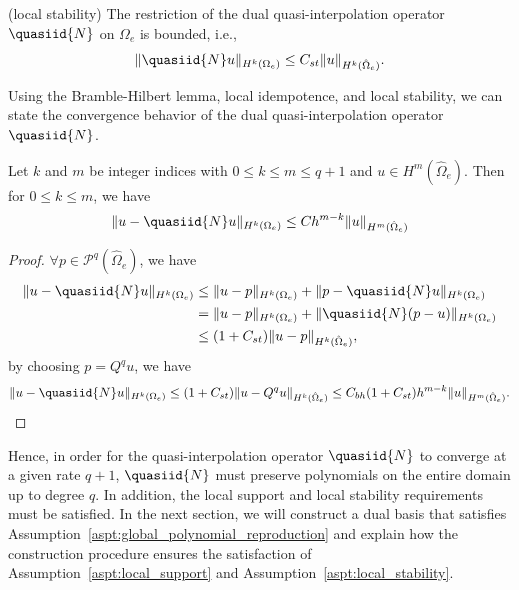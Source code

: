 \begin{assumption}\label{aspt:local_stability}
	(local stability) The restriction of the dual quasi-interpolation operator $\quasiid{N}$ on $\Omega_e$ is bounded, i.e.,
	\begin{equation}
		\|\quasiid{N}u\|_{H^k(\Omega_e)}\leq{}C_{st}\|u\|_{H^k(\hat{\Omega}_e)}.
	\end{equation}
\end{assumption}

Using the Bramble-Hilbert lemma, local idempotence, and local stability, we can state the convergence behavior of the dual quasi-interpolation operator $\quasiid{N}$.

\begin{theorem}
	Let $k$ and $m$ be integer indices with $0\leq{k}\leq{m}\leq{q+1}$ and $u\in{}H^m(\hat{\Omega}_e)$. Then for $0\leq{}k\leq{}m$, we have
	\begin{equation}
		\|{u-\quasiid{N}u}\|_{H^k(\Omega_e)}\leq{}C_{}h^{m-k}\|{u}\|_{H^m(\hat{\Omega}_e)}
	\end{equation}
	\begin{proof}
		$\forall{}p\in\mathcal{P}^q(\hat{\Omega}_e)$, we have
		\begin{align}
			\begin{split}
				\|{u-\quasiid{N}u}\|_{H^k(\Omega_e)}&\leq{}\|{u-p}\|_{H^k(\Omega_e)}+\|{p-\quasiid{N}u}\|_{H^k(\Omega_e)}\\
				&=\|{u-p}\|_{H^k(\Omega_e)}+\|{\quasiid{N}(p-u)}\|_{H^k(\Omega_e)}\\
				&\leq{}(1+C_{st})\|{u-p}\|_{H^k(\hat{\Omega}_e)},
			\end{split}
		\end{align}
		by choosing $p=Q^qu$, we have
		\begin{equation}
			\|{u-\quasiid{N}u}\|_{H^k(\Omega_e)}\leq{}(1+C_{st})\|{u-Q^qu}\|_{H^k(\hat{\Omega}_e)}\leq{}C_{bh}(1+C_{st})h^{m-k}\|{u}\|_{H^m(\hat{\Omega}_e)}.
		\end{equation}
	\end{proof}
\end{theorem}
Hence, in order for the quasi-interpolation operator $\quasiid{N}$ to converge at a given rate $q+1$, $\quasiid{N}$ must preserve polynomials on the entire domain up to degree $q$. In addition, the local support and local stability requirements must be satisfied. In the next section, we will construct a dual basis that satisfies Assumption~\ref{aspt:global_polynomial_reproduction} and explain how the construction procedure ensures the satisfaction of Assumption~\ref{aspt:local_support} and Assumption~\ref{aspt:local_stability}.

